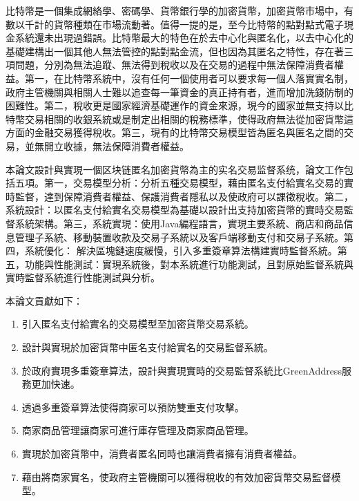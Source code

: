 
\begin{cabstract}

	比特幣是一個集成網絡學、密碼學、貨幣銀行學的加密貨幣，加密貨幣市場中，有數以千計的貨幣種類在市場流動著。值得一提的是，至今比特幣的點對點式電子現金系統還未出現過錯誤。比特幣最大的特色在於去中心化與匿名化，以去中心化的基礎建構出一個其他人無法管控的點對點金流，但也因為其匿名之特性，存在著三項問題，分別為無法追蹤、無法得到稅收以及在交易的過程中無法保障消費者權益。第一，在比特幣系統中，沒有任何一個使用者可以要求每一個人落實實名制，政府主管機關與相關人士難以追查每⼀筆資金的真正持有者，進而增加洗錢防制的困難性。第二，稅收更是國家經濟基礎運作的資金來源，現今的國家並無支持以比特幣交易相關的收銀系統或是制定出相關的稅務標準，使得政府無法從加密貨幣這方面的金融交易獲得稅收。第三，現有的比特幣交易模型皆為匿名與匿名之間的交易，並無開立收據，無法保障消費者權益。

	本論文設計與實現一個区块链匿名加密貨幣為主的实名交易监督系统，論文工作包括五項。第一，交易模型分析：分析五種交易模型，藉由匿名支付給實名交易的實時監督，達到保障消費者權益、保護消費者隱私以及使政府可以課徵稅收。第二，系統設計：以匿名支付給實名交易模型為基礎以設計出支持加密貨幣的實時交易監督系統架構。第三，系統實現：使用Java編程語言，實現主要系統、商店和商品信息管理子系統、移動裝置收款及交易子系統以及客戶端移動支付和交易子系統。第四，系統優化：
	解決區塊鏈速度緩慢，引入多重簽章算法構建實時監督系統。第五，功能與性能測試：實現系統後，對本系統進行功能測試，且對原始監督系統與實時監督系統進行性能測試與分析。

	本論文貢獻如下：
	\begin{enumerate}
		\item 引入匿名支付給實名的交易模型至加密貨幣交易系統。
		\item 設計與實現於加密貨幣中匿名支付給實名的交易監督系統。
		\item 於政府實現多重簽章算法，設計與實現實時的交易監督系統比GreenAddress服務更加快速。
		\item 透過多重簽章算法使得商家可以預防雙重支付攻擊。
		\item 商家商品管理讓商家可進行庫存管理及商家商品管理。
		\item 實現於加密貨幣中，消費者匿名同時也讓消費者擁有消費者權益。
		\item 藉由將商家實名，使政府主管機關可以獲得稅收的有效加密貨幣交易監督模型。
	\end{enumerate}


\end{cabstract}

